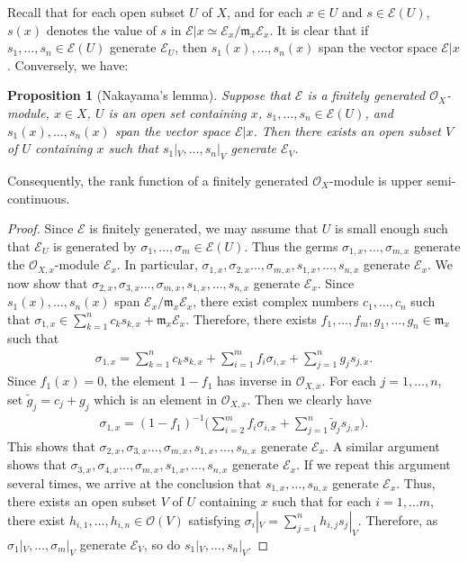 \documentclass[12pt,a4paper,notitlepage]{report}
\theoremstyle{definition}
\theoremstyle{plain}
\newtheorem{pp}[df]{Proposition}
\newcommand{\fk}{\mathfrak}
\newcommand{\wtd}{\widetilde}
\newcommand{\scr}{\mathscr}
\numberwithin{equation}{section}
\begin{document}
Recall that for each open subset $U$ of $X$, and for each  $x\in U$ and $s\in\scr E(U)$, $s(x)$ denotes the value of $s$ in $\scr E|x\simeq \scr E_x/\fk m_x\scr E_x$. It is clear that if $s_1,\dots,s_n\in\scr E(U)$ generate $\scr E_U$, then $s_1(x),\dots,s_n(x)$ span the vector space $\scr E|x$. Conversely, we have:

\begin{pp}[Nakayama's lemma]\label{lb60}
Suppose that $\scr E$ is a finitely generated $\scr O_X$-module, $x\in X$, $U$ is an open set containing $x$, $s_1,\dots,s_n\in\scr E(U)$, and $s_1(x),\dots,s_n(x)$ span the vector space $\scr E|x$. Then there exists an open subset $V$ of $U$ containing $x$ such that $s_1|_V,\dots,s_n|_V$ generate $\scr E_V$. 
\end{pp}

Consequently, the rank function of a finitely generated $\scr O_X$-module is upper semi-continuous.

\begin{proof}
Since $\scr E$ is  finitely generated, we may assume that $U$ is small enough such that $\scr E_U$ is generated  by $\sigma_1,\dots,\sigma_m\in\scr E(U)$. Thus the germs $\sigma_{1,x},\dots,\sigma_{m,x}$ generate the $\scr O_{X,x}$-module $\scr E_x$. In particular, $\sigma_{1,x},\sigma_{2,x}\dots,\sigma_{m,x},s_{1,x},\dots,s_{n,x}$ generate $\scr E_x$. We now show that $\sigma_{2,x},\sigma_{3,x}\dots,\sigma_{m,x},s_{1,x},\dots,s_{n,x}$ generate $\scr E_x$. Since $s_1(x),\dots,s_n(x)$ span $\scr E_x/\fk m_x\scr E_x$, there exist complex numbers $c_1,\dots,c_n$ such that $\sigma_{1,x}\in\sum_{k=1}^n c_ks_{k,x}+\fk m_x\scr E_x$. Therefore, there exists $f_1,\dots,f_m,g_1,\dots,g_n\in\fk m_x$ such that
\begin{align*}
\sigma_{1,x}=\sum_{k=1}^n c_ks_{k,x}+\sum_{i=1}^m f_i\sigma_{i,x}+\sum_{j=1}^n g_j s_{j,x}.
\end{align*}
Since $f_1(x)=0$, the element $1-f_1$ has inverse  in $\scr O_{X,x}$. For each $j=1,\dots,n$, set $\wtd g_j=c_j+g_j$ which is an element in $\scr O_{X,x}$. Then we clearly have
\begin{align*}
\sigma_{1,x}=(1-f_1)^{-1}\bigg(\sum_{i=2}^m f_i\sigma_{i,x}+\sum_{j=1}^n \wtd g_j s_{j,x}  \bigg).
\end{align*}
This shows that $\sigma_{2,x},\sigma_{3,x}\dots,\sigma_{m,x},s_{1,x},\dots,s_{n,x}$ generate $\scr E_x$. A similar argument shows that $\sigma_{3,x},\sigma_{4,x}\dots,\sigma_{m,x},s_{1,x},\dots,s_{n,x}$ generate $\scr E_x$. If we repeat this argument several times, we arrive at the conclusion that $s_{1,x},\dots,s_{n,x}$ generate $\scr E_x$. Thus, there exists an open subset $V$ of $U$ containing $x$ such that for each $i=1,\dots m$, there exist $h_{i,1},\dots,h_{i,n}\in\scr O(V)$ satisfying $\sigma_i|_V=\sum_{j=1}^n h_{i,j} s_j|_V$. Therefore, as $\sigma_1|_V,\dots,\sigma_m|_V$ generate  $\scr E_V$, so do $s_1|_V,\dots,s_n|_V$.
\end{proof}
\end{document}
